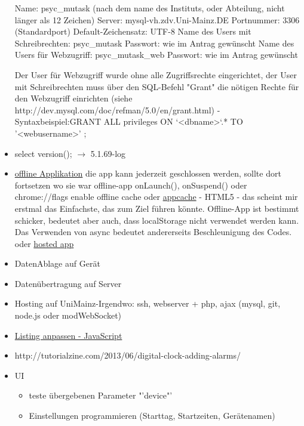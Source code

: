 \documentclass[a4paper]{scrartcl}
\begin{document}
\begin{itemize}
					Name: psyc\_mutask (nach dem name des Instituts, oder Abteilung, nicht länger als 12 Zeichen)\newline
					Server: mysql-vh.zdv.Uni-Mainz.DE\newline
					Portnummer: 3306 (Standardport)\newline
					Default-Zeichensatz: UTF-8\newline
					Name des Users mit Schreibrechten: psyc\_mutask\newline
					Passwort: wie im Antrag gewünscht\newline
					Name des Users für Webzugriff: psyc\_mutask\_web\newline
					Passwort: wie im Antrag gewünscht

					Der User für Webzugriff wurde ohne alle Zugriffsrechte eingerichtet, der User mit Schreibrechten muss über den SQL-Befehl "Grant" die nötigen Rechte für den Webzugriff einrichten (siehe http://dev.mysql.com/doc/refman/5.0/en/grant.html) - Syntaxbeispiel:\newline GRANT ALL privileges ON `<dbname>`.* TO '<webusername>' ;
				\item select version(); $\rightarrow$ 5.1.69-log
				\item \href{http://developer.chrome.com/apps}{offline Applikation}\newline
					die app kann jederzeit geschlossen werden, sollte dort fortsetzen wo sie war\newline
					offline-app onLaunch(), onSuspend()\newline
					oder chrome://flags enable offline cache\newline
					oder \href{http://appcachefacts.info/}{appcache} - HTML5 - das scheint mir erstmal das Einfachste, das zum Ziel führen könnte. Offline-App ist bestimmt schicker, bedeutet aber auch, dass localStorage nicht verwendet werden kann. Das Verwenden von async bedeutet andererseits Beschleunigung des Codes.
					oder \href{https://developers.google.com/chrome/apps/docs/developers_guide?csw=1}{hosted app}
				\item DatenAblage auf Gerät
				\item Datenübertragung auf Server
				\item Hosting auf UniMainz-Irgendwo: ssh, webserver + php, ajax (mysql, git, node.js oder modWebSocket)
				\item \href{http://mirror.math.ku.edu/tex-archive/macros/latex/contrib/listings/listings.pdf}{Listing anpassen - JavaScript} 
				\item http://tutorialzine.com/2013/06/digital-clock-adding-alarms/ 
				\item UI
					\begin{itemize}
						\item teste übergebenen Parameter "'device"'
						\item Einstellungen programmieren (Starttag, Startzeiten, Gerätenamen)
					\end{itemize}
			\end{itemize}
\end{document}
